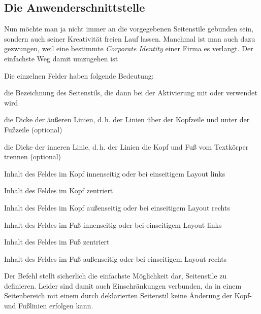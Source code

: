 \subsection{Die Anwenderschnittstelle}\label{sec:scrpage-de.UI.user}

Nun möchte man ja nicht immer an die vorgegebenen Seitenstile gebunden sein,
sondern auch seiner Kreativität freien Lauf lassen.
Manchmal ist man auch dazu gezwungen, weil eine bestimmte
\emph{Corporate Identity} einer Firma es verlangt.
Der einfachste Weg damit umzugehen ist
\begin{Declaration}
\end{Declaration}%
Die einzelnen Felder haben folgende Bedeutung:
\begin{labeling}[~--]{}
\item[\PName{Name}] die Bezeichnung des Seitenstils, die dann bei der
  Aktivierung mit  oder
   verwendet wird
\item[\PName{LA}] die Dicke der äußeren Linien, d.\,h. der Linien über der
  Kopfzeile und unter der Fußzeile (optional)
\item[\PName{LI}] die Dicke der inneren Linie, d.\,h. der Linien die Kopf und
  Fuß vom Textkörper trennen (optional)
\item[\PName{KI}] Inhalt des Feldes im Kopf innenseitig oder bei einseitigem
  Layout links
\item[\PName{KM}] Inhalt des Feldes im Kopf zentriert
\item[\PName{KA}] Inhalt des Feldes im Kopf außenseitig oder bei einseitigem
  Layout rechts
\item[\PName{FI}] Inhalt des Feldes im Fuß innenseitig oder bei einseitigem
  Layout links
\item[\PName{FM}] Inhalt des Feldes im Fuß zentriert
\item[\PName{FA}] Inhalt des Feldes im Fuß außenseitig oder bei einseitigem
  Layout rechts
\end{labeling}

Der Befehl  stellt sicherlich die einfachste
Möglichkeit dar, Seitenstile zu definieren.
Leider sind damit auch Einschränkungen verbunden,
da in einem Seitenbereich mit einem durch  deklarierten 
Seitenstil keine Änderung der Kopf- und Fußlinien erfolgen kann.

